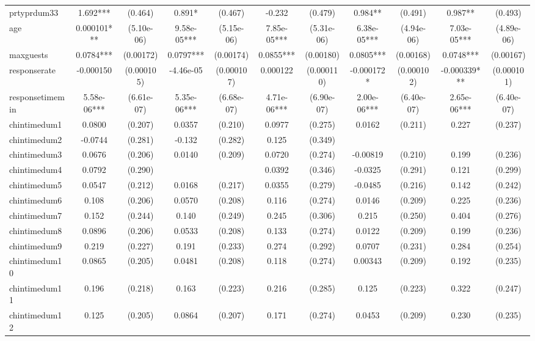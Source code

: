 \documentclass[]{article}
\begin{document}
\begin{tabular}{lcccccccccc}
prtyprdum33 & 1.692*** & (0.464) & 0.891* & (0.467) & -0.232 & (0.479) & 0.984** & (0.491) & 0.987** & (0.493) \\
age & 0.000101*** & (5.10e-06) & 9.58e-05*** & (5.15e-06) & 7.85e-05*** & (5.31e-06) & 6.38e-05*** & (4.94e-06) & 7.03e-05*** & (4.89e-06) \\
maxguests & 0.0784*** & (0.00172) & 0.0797*** & (0.00174) & 0.0855*** & (0.00180) & 0.0805*** & (0.00168) & 0.0748*** & (0.00167) \\
responserate & -0.000150 & (0.000105) & -4.46e-05 & (0.000107) & 0.000122 & (0.000110) & -0.000172* & (0.000102) & -0.000339*** & (0.000101) \\
responsetimemin & 5.58e-06*** & (6.61e-07) & 5.35e-06*** & (6.68e-07) & 4.71e-06*** & (6.90e-07) & 2.00e-06*** & (6.40e-07) & 2.65e-06*** & (6.40e-07) \\
chintimedum1 & 0.0800 & (0.207) & 0.0357 & (0.210) & 0.0977 & (0.275) & 0.0162 & (0.211) & 0.227 & (0.237) \\
chintimedum2 & -0.0744 & (0.281) & -0.132 & (0.282) & 0.125 & (0.349) &  &  &  &  \\
chintimedum3 & 0.0676 & (0.206) & 0.0140 & (0.209) & 0.0720 & (0.274) & -0.00819 & (0.210) & 0.199 & (0.236) \\
chintimedum4 & 0.0792 & (0.290) &  &  & 0.0392 & (0.346) & -0.0325 & (0.291) & 0.121 & (0.299) \\
chintimedum5 & 0.0547 & (0.212) & 0.0168 & (0.217) & 0.0355 & (0.279) & -0.0485 & (0.216) & 0.142 & (0.242) \\
chintimedum6 & 0.108 & (0.206) & 0.0570 & (0.208) & 0.116 & (0.274) & 0.0146 & (0.209) & 0.225 & (0.236) \\
chintimedum7 & 0.152 & (0.244) & 0.140 & (0.249) & 0.245 & (0.306) & 0.215 & (0.250) & 0.404 & (0.276) \\
chintimedum8 & 0.0896 & (0.206) & 0.0533 & (0.208) & 0.133 & (0.274) & 0.0122 & (0.209) & 0.199 & (0.236) \\
chintimedum9 & 0.219 & (0.227) & 0.191 & (0.233) & 0.274 & (0.292) & 0.0707 & (0.231) & 0.284 & (0.254) \\
chintimedum10 & 0.0865 & (0.205) & 0.0481 & (0.208) & 0.118 & (0.274) & 0.00343 & (0.209) & 0.192 & (0.235) \\
chintimedum11 & 0.196 & (0.218) & 0.163 & (0.223) & 0.216 & (0.285) & 0.125 & (0.223) & 0.322 & (0.247) \\
chintimedum12 & 0.125 & (0.205) & 0.0864 & (0.207) & 0.171 & (0.274) & 0.0453 & (0.209) & 0.230 & (0.235) \\

\end{tabular}
\end{document}
